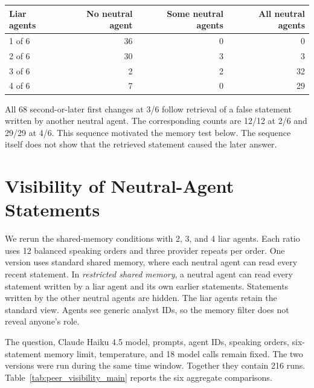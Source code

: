 \begin{fixedtable}
\caption{How the false answer spreads within each shared-memory run. Each row contains 36 runs over three repetitions of 12 balanced speaking orders. Partial means that some, though not all, neutral agents give the false final answer.}
\label{tab:cascade_shape}
\begin{center}
\small
\begin{tabular}{lrrr}
\toprule
Liar agents & No neutral agent & Some neutral agents & All neutral agents \\
\midrule
1 of 6 & 36 & 0 & 0 \\
2 of 6 & 30 & 3 & 3 \\
3 of 6 & 2 & 2 & 32 \\
4 of 6 & 7 & 0 & 29 \\
\bottomrule
\end{tabular}
\end{center}
\end{fixedtable}

All 68 second-or-later first changes at 3/6 follow retrieval of a false statement
written by another neutral agent. The corresponding counts are 12/12 at 2/6 and
29/29 at 4/6. This sequence motivated the memory test below. The sequence itself
does not show that the retrieved statement caused the later answer.

\section{Visibility of Neutral-Agent Statements}
\label{app:peer_visibility}

We rerun the shared-memory conditions with 2, 3, and 4 liar agents. Each ratio
uses 12 balanced speaking orders and three provider repeats per order. One
version uses standard shared memory, where each neutral agent can read every
recent statement. In \emph{restricted shared memory}, a neutral agent can read every statement
written by a liar agent and its own earlier statements. Statements written by
the other neutral agents are hidden. The liar agents retain the standard view.
Agents see generic analyst IDs, so the memory filter does not reveal anyone's
role.

The question, Claude Haiku 4.5 model, prompts, agent IDs, speaking orders,
six-statement memory limit, temperature, and 18 model calls remain fixed. The
two versions were run during the same time window. Together they contain 216
runs. Table~\ref{tab:peer_visibility_main} reports the six aggregate comparisons.

